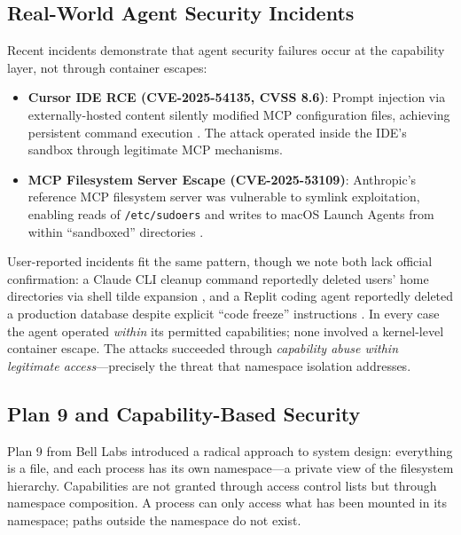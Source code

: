 \documentclass[acmsmall,screen,review]{acmart}
\begin{document}
\subsection{Real-World Agent Security Incidents}

Recent incidents demonstrate that agent security failures occur at the capability layer, not through container escapes:

\begin{itemize}
    \item \textbf{Cursor IDE RCE (CVE-2025-54135, CVSS 8.6)}: Prompt injection via externally-hosted content silently modified MCP configuration files, achieving persistent command execution \cite{cursor2025rce}. The attack operated inside the IDE's sandbox through legitimate MCP mechanisms.

    \item \textbf{MCP Filesystem Server Escape (CVE-2025-53109)}: Anthropic's reference MCP filesystem server was vulnerable to symlink exploitation, enabling reads of \texttt{/etc/sudoers} and writes to macOS Launch Agents from within ``sandboxed'' directories \cite{nvdCVE202553109}.
\end{itemize}

User-reported incidents fit the same pattern, though we note both lack official confirmation: a Claude CLI cleanup command reportedly deleted users' home directories via shell tilde expansion \cite{claudecli2024incident}, and a Replit coding agent reportedly deleted a production database despite explicit ``code freeze'' instructions \cite{replit2025incident}. In every case the agent operated \textit{within} its permitted capabilities; none involved a kernel-level container escape. The attacks succeeded through \textit{capability abuse within legitimate access}---precisely the threat that namespace isolation addresses.

\subsection{Plan 9 and Capability-Based Security}

Plan 9 from Bell Labs \cite{pike1990plan9} introduced a radical approach to system design: everything is a file, and each process has its own namespace---a private view of the filesystem hierarchy. Capabilities are not granted through access control lists but through namespace composition. A process can only access what has been mounted in its namespace; paths outside the namespace do not exist.
\end{document}
